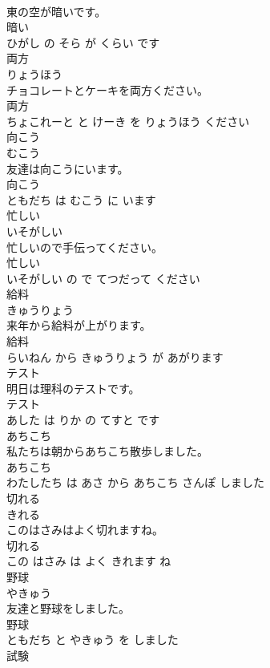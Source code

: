 \documentclass[8pt]{extreport}
\begin{document}
\begin{CJK}{UTF8}{min}
\\	東の空が暗いです。	
\\	暗い 
\\	ひがし の そら が くらい です			
\\	両方	
\\	りょうほう			
\\	チョコレートとケーキを両方ください。	
\\	両方 
\\	ちょこれーと と けーき を りょうほう ください			
\\	向こう	
\\	むこう			
\\	友達は向こうにいます。	
\\	向こう 
\\	ともだち は むこう に います			
\\	忙しい	
\\	いそがしい			
\\	忙しいので手伝ってください。	
\\	忙しい 
\\	いそがしい の で てつだって ください			
\\	給料	
\\	きゅうりょう			
\\	来年から給料が上がります。	
\\	給料 
\\	らいねん から きゅうりょう が あがります			
\\	テスト	
\\	明日は理科のテストです。	
\\	テスト 
\\	あした は りか の てすと です			
\\	あちこち	
\\	私たちは朝からあちこち散歩しました。	
\\	あちこち 
\\	わたしたち は あさ から あちこち さんぽ しました			
\\	切れる	
\\	きれる			
\\	このはさみはよく切れますね。	
\\	切れる 
\\	この はさみ は よく きれます ね			
\\	野球	
\\	やきゅう			
\\	友達と野球をしました。	
\\	野球 
\\	ともだち と やきゅう を しました			
\\	試験	

\end{CJK}
\end{document}
